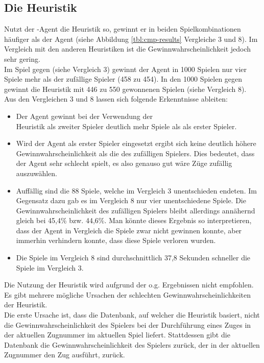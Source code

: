 \subsection{Die Heuristik }
\authorpatrick
\label{fz:h_smc}
Nutzt der \mxZitat{\abp}-Agent die  Heuristik so, gewinnt er in beiden Spielkombinationen häufiger als der  Agent (siehe Abbildung \ref{tbl:cmp-results} Vergleiche 3 und 8). Im Vergleich mit den anderen Heuristiken ist die Gewinnwahrscheinlichkeit jedoch sehr gering.
\\Im Spiel  gegen  (siehe Vergleich 3) gewinnt der Agent in 1000 Spielen nur vier Spiele mehr als der zufällige Spieler (458 zu 454). In den 1000 Spielen  gegen  gewinnt die Heuristik mit 446 zu 550 gewonnenen Spielen (siehe Vergleich 8).
\\Aus den Vergleichen 3 und 8 lassen sich folgende Erkenntnisse ableiten:
\begin{itemize}
\item Der Agent \mxZitat{\abp} gewinnt bei der Verwendung der \\ Heuristik als zweiter Spieler deutlich mehr Spiele als als erster Spieler.
\item Wird der Agent als erster Spieler eingesetzt ergibt sich keine deutlich höhere Gewinnwahrscheinlichkeit als die des zufälligen Spielers. Dies bedeutet, dass der Agent sehr schlecht spielt, es also genauso gut wäre Züge zufällig auszuwählen. 
\item Auffällig sind die 88 Spiele, welche im Vergleich 3 unentschieden endeten. Im Gegensatz dazu gab es im Vergleich 8 nur vier unentschiedene Spiele. Die Gewinnwahrscheinlichkeit des zufälligen Spielers bleibt allerdings annähernd gleich bei 45,4\% bzw. 44,6\%. Man könnte dieses Ergebnis so interpretieren, dass der Agent in Vergleich die Spiele zwar nicht gewinnen konnte, aber immerhin verhindern konnte, dass diese Spiele verloren wurden.
\item Die Spiele im Vergleich 8 sind durchschnittlich 37,8 Sekunden schneller die Spiele im Vergleich 3.
\end{itemize}
Die Nutzung der Heuristik  wird aufgrund der o.g. Ergebnissen nicht empfohlen.
\\Es gibt mehrere mögliche Ursachen der schlechten Gewinnwahrscheinlichkeiten der Heuristik.
\vspace{0.5cm}
\\Die erste Ursache ist, dass die Datenbank, auf welcher die Heuristik basiert, nicht die Gewinnwahrscheinlichkeit des Spielers bei der Durchführung eines Zuges in der aktuellen Zugnummer im aktuellen Spiel liefert. Stattdessen gibt die Datenbank die Gewinnwahrscheinlichkeit des Spielers zurück, der in der aktuellen Zugnummer den Zug ausführt, zurück.
